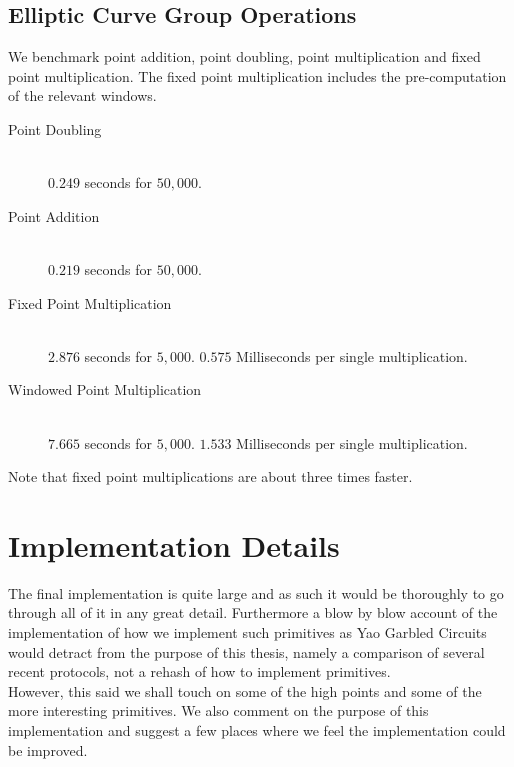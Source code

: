 \documentclass[ %
                    author={Nicholas Tutte},
                supervisor={Prof. Nigel Smart},
                    degree={MEng},
                     title={Secure Two Party Computation},
                  subtitle={A practical comparison of recent protocols},
                      type={Research - GG1K},
                      year={2015} ]{dissertation}
\begin{document}
\begin{appendices}
			\pagebreak
			\section{Elliptic Curve Group Operations}

				We benchmark point addition, point doubling, point multiplication and fixed point multiplication. The fixed point multiplication includes the pre-computation of the relevant windows.


				\begin{description}
					\item[Point Doubling] \hfill \\
						$0.249$ seconds for $50,000$.

					\item[Point Addition] \hfill \\
						$0.219$ seconds for $50,000$.

					\item[Fixed Point Multiplication] \hfill \\
						$2.876$ seconds for $5,000$. $0.575$ Milliseconds per single multiplication.

					\item[Windowed Point Multiplication] \hfill \\
						$7.665$ seconds for $5,000$. $1.533$ Milliseconds per single multiplication.
				\end{description}

				Note that fixed point multiplications are about three times faster.


		\chapter{Implementation Details} \label{sec:ImplementationDetails}
			The final implementation is quite large and as such it would be thoroughly to go through all of it in any great detail. Furthermore a blow by blow account of the implementation of how we implement such primitives as Yao Garbled Circuits would detract from the purpose of this thesis, namely a comparison of several recent protocols, not a rehash of how to implement primitives.\\

			However, this said we shall touch on some of the high points and some of the more interesting primitives. We also comment on the purpose of this implementation and suggest a few places where we feel the implementation could be improved.


\end{appendices}
\end{document}
